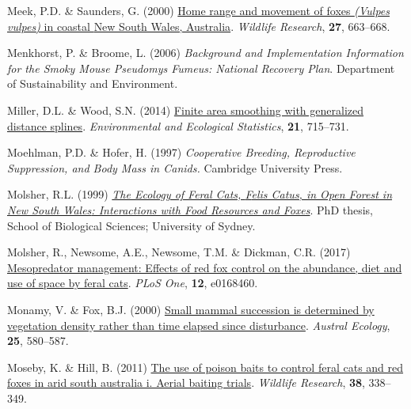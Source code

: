 \documentclass[11pt,a4paper,titlepage,twoside,openright]{style/unimelbthesis}
\newenvironment{CSLReferences}%
  {}%
  {\par}
\begin{document}
\begin{mainmatter}
\begin{CSLReferences}{1}{0}
\leavevmode{}%
Meek, P.D. \& Saunders, G. (2000) \href{https://doi.org/10.1071/WR98030}{Home range and movement of foxes \emph{({Vulpes vulpes})} in coastal {New South Wales, A}ustralia}. \emph{Wildlife Research}, \textbf{27}, 663--668.

\leavevmode{}%
Menkhorst, P. \& Broome, L. (2006) \emph{Background and Implementation Information for the Smoky Mouse {P}seudomys Fumeus: National Recovery Plan}. {Department of Sustainability and Environment}.

\leavevmode{}%
Miller, D.L. \& Wood, S.N. (2014) \href{https://doi.org/10.1007/s10651-014-0277-4}{Finite area smoothing with generalized distance splines}. \emph{Environmental and Ecological Statistics}, \textbf{21}, 715--731.

\leavevmode{}%
Moehlman, P.D. \& Hofer, H. (1997) \emph{Cooperative Breeding, Reproductive Suppression, and Body Mass in Canids.} Cambridge University Press.

\leavevmode{}%
Molsher, R.L. (1999) \emph{\href{https://ses.library.usyd.edu.au/bitstream/handle/2123/411/adt-NU2000.0011main.pdf?sequence=2}{The Ecology of Feral Cats, {F}elis Catus, in Open Forest in {New South Wales}: Interactions with Food Resources and Foxes}}. PhD thesis, School of Biological Sciences; University of Sydney.

\leavevmode{}%
Molsher, R., Newsome, A.E., Newsome, T.M. \& Dickman, C.R. (2017) \href{https://doi.org/10.1371/journal.pone.0168460}{Mesopredator management: Effects of red fox control on the abundance, diet and use of space by feral cats}. \emph{PLoS One}, \textbf{12}, e0168460.

\leavevmode{}%
Monamy, V. \& Fox, B.J. (2000) \href{https://doi.org/10.1111/j.1442-9993.2000.tb00063.x}{Small mammal succession is determined by vegetation density rather than time elapsed since disturbance}. \emph{Austral Ecology}, \textbf{25}, 580--587.

\leavevmode{}%
Moseby, K. \& Hill, B. (2011) \href{https://doi.org/10.1071/WR10235}{The use of poison baits to control feral cats and red foxes in arid south australia i. Aerial baiting trials}. \emph{Wildlife Research}, \textbf{38}, 338--349.


\end{CSLReferences}
\end{mainmatter}
\end{document}
